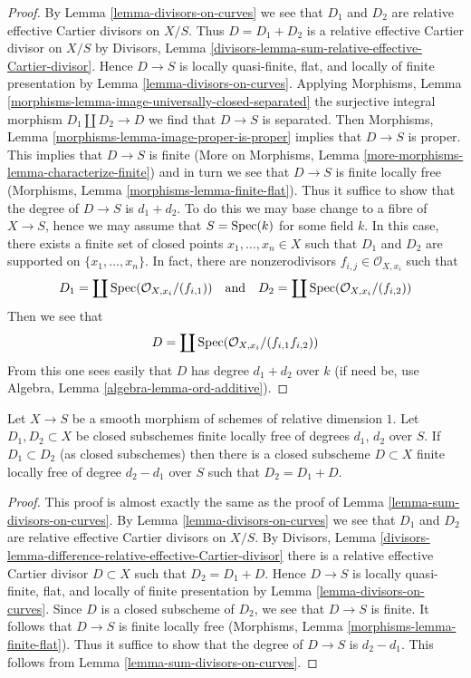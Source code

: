 \begin{proof}
By Lemma \ref{lemma-divisors-on-curves} we see that $D_1$
and $D_2$ are relative effective Cartier divisors on $X/S$.
Thus $D = D_1 + D_2$ is a relative effective Cartier divisor
on $X/S$ by
Divisors, Lemma \ref{divisors-lemma-sum-relative-effective-Cartier-divisor}.
Hence $D \to S$ is locally quasi-finite, flat, and
locally of finite presentation by
Lemma \ref{lemma-divisors-on-curves}.
Applying
Morphisms, Lemma \ref{morphisms-lemma-image-universally-closed-separated}
the surjective integral morphism $D_1 \amalg D_2 \to D$
we find that $D \to S$ is separated. Then
Morphisms, Lemma \ref{morphisms-lemma-image-proper-is-proper}
implies that $D \to S$ is proper.
This implies that $D \to S$ is finite
(More on Morphisms, Lemma \ref{more-morphisms-lemma-characterize-finite})
and in turn we see that $D \to S$ is finite locally free
(Morphisms, Lemma \ref{morphisms-lemma-finite-flat}).
Thus it suffice to show that the degree of $D \to S$ is $d_1 + d_2$.
To do this we may base change to a fibre of $X \to S$, hence we may
assume that $S = \mathop{\mathrm{Spec}}(k)$ for some field $k$.
In this case, there exists a finite set of closed points
$x_1, \ldots, x_n \in X$ such that $D_1$ and $D_2$
are supported on $\{x_1, \ldots, x_n\}$.
In fact, there are nonzerodivisors $f_{i, j} \in \mathcal{O}_{X, x_i}$
such that
$$
D_1 = \coprod \mathop{\mathrm{Spec}}(\mathcal{O}_{X, x_i}/(f_{i, 1}))
\quad\text{and}\quad
D_2 = \coprod \mathop{\mathrm{Spec}}(\mathcal{O}_{X, x_i}/(f_{i, 2}))
$$
Then we see that
$$
D = \coprod \mathop{\mathrm{Spec}}(\mathcal{O}_{X, x_i}/(f_{i, 1}f_{i, 2}))
$$
From this one sees easily that $D$ has degree $d_1 + d_2$
over $k$ (if need be, use Algebra, Lemma \ref{algebra-lemma-ord-additive}).
\end{proof}

\begin{lemma}
\label{lemma-difference-divisors-on-curves}
Let $X \to S$ be a smooth morphism of schemes of relative dimension $1$.
Let $D_1, D_2 \subset X$ be closed subschemes finite locally free of
degrees $d_1$, $d_2$ over $S$. If $D_1 \subset D_2$ (as closed subschemes)
then there is a closed subscheme $D \subset X$ finite locally free of
degree $d_2 - d_1$ over $S$ such that $D_2 = D_1 + D$.
\end{lemma}

\begin{proof}
This proof is almost exactly the same as the proof of
Lemma \ref{lemma-sum-divisors-on-curves}.
By Lemma \ref{lemma-divisors-on-curves} we see that $D_1$
and $D_2$ are relative effective Cartier divisors on $X/S$.
By Divisors, Lemma
\ref{divisors-lemma-difference-relative-effective-Cartier-divisor}
there is a relative effective Cartier divisor $D \subset X$
such that $D_2 = D_1 + D$. Hence $D \to S$ is locally quasi-finite, flat, and
locally of finite presentation by
Lemma \ref{lemma-divisors-on-curves}.
Since $D$ is a closed subscheme of $D_2$, we see that
$D \to S$ is finite. It follows that $D \to S$ is finite locally free
(Morphisms, Lemma \ref{morphisms-lemma-finite-flat}).
Thus it suffice to show that the degree of $D \to S$ is $d_2 - d_1$.
This follows from Lemma \ref{lemma-sum-divisors-on-curves}.
\end{proof}


